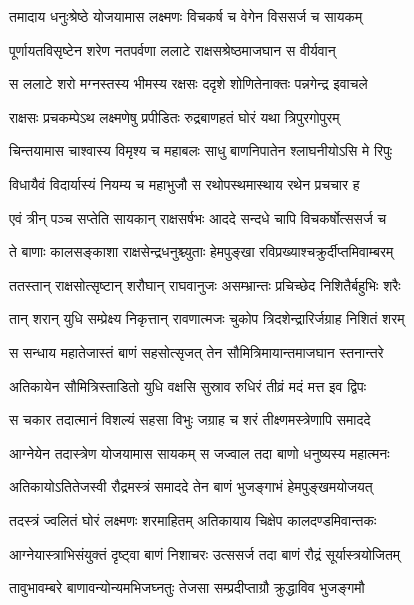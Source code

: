 \twolineshloka
{तमादाय धनुःश्रेष्ठे योजयामास लक्ष्मणः}
{विचकर्ष च वेगेन विससर्ज च सायकम्} %

\twolineshloka
{पूर्णायतविसृष्टेन शरेण नतपर्वणा}
{ललाटे राक्षसश्रेष्ठमाजघान स वीर्यवान्} %

\twolineshloka
{स ललाटे शरो मग्नस्तस्य भीमस्य रक्षसः}
{ददृशे शोणितेनाक्तः पन्नगेन्द्र इवाचले} %

\twolineshloka
{राक्षसः प्रचकम्पेऽथ लक्ष्मणेषु प्रपीडितः}
{रुद्रबाणहतं घोरं यथा त्रिपुरगोपुरम्} %

\twolineshloka
{चिन्तयामास चाश्वास्य विमृश्य च महाबलः}
{साधु बाणनिपातेन श्लाघनीयोऽसि मे रिपुः} %

\twolineshloka
{विधायैवं विदार्यास्यं नियम्य च महाभुजौ}
{स रथोपस्थमास्थाय रथेन प्रचचार ह} %

\twolineshloka
{एवं त्रीन् पञ्च सप्तेति सायकान् राक्षसर्षभः}
{आददे सन्दधे चापि विचकर्षोत्ससर्ज च} %

\twolineshloka
{ते बाणाः कालसङ्काशा राक्षसेन्द्रधनुश्च्युताः}
{हेमपुङ्खा रविप्रख्याश्चक्रुर्दीप्तमिवाम्बरम्} %

\twolineshloka
{ततस्तान् राक्षसोत्सृष्टान् शरौघान् राघवानुजः}
{असम्भ्रान्तः प्रचिच्छेद निशितैर्बहुभिः शरैः} %

\twolineshloka
{तान् शरान् युधि सम्प्रेक्ष्य निकृत्तान् रावणात्मजः}
{चुकोप त्रिदशेन्द्रारिर्जग्राह निशितं शरम्} %

\twolineshloka
{स सन्धाय महातेजास्तं बाणं सहसोत्सृजत्}
{तेन सौमित्रिमायान्तमाजघान स्तनान्तरे} %

\twolineshloka
{अतिकायेन सौमित्रिस्ताडितो युधि वक्षसि}
{सुस्राव रुधिरं तीव्रं मदं मत्त इव द्विपः} %

\twolineshloka
{स चकार तदात्मानं विशल्यं सहसा विभुः}
{जग्राह च शरं तीक्ष्णमस्त्रेणापि समाददे} %

\twolineshloka
{आग्नेयेन तदास्त्रेण योजयामास सायकम्}
{स जज्वाल तदा बाणो धनुष्यस्य महात्मनः} %

\twolineshloka
{अतिकायोऽतितेजस्वी रौद्रमस्त्रं समाददे}
{तेन बाणं भुजङ्गाभं हेमपुङ्खमयोजयत्} %

\twolineshloka
{तदस्त्रं ज्वलितं घोरं लक्ष्मणः शरमाहितम्}
{अतिकायाय चिक्षेप कालदण्डमिवान्तकः} %

\twolineshloka
{आग्नेयास्त्राभिसंयुक्तं दृष्ट्वा बाणं निशाचरः}
{उत्ससर्ज तदा बाणं रौद्रं सूर्यास्त्रयोजितम्} %

\twolineshloka
{तावुभावम्बरे बाणावन्योन्यमभिजघ्नतुः}
{तेजसा सम्प्रदीप्ताग्रौ क्रुद्धाविव भुजङ्गमौ} %

